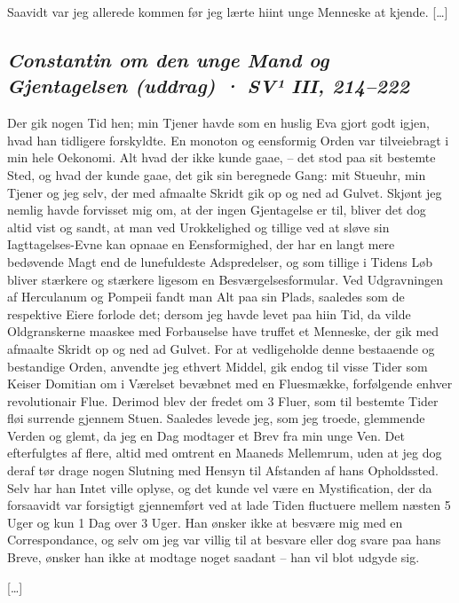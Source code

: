 \documentclass[12pt,a4paper]{article}
\newcommand{\sectionheading}[1]{\subsection*{\normalfont\itshape #1}}
\begin{document}
Saavidt var jeg allerede kommen før jeg lærte hiint unge Menneske at kjende. […]

\sectionheading{Constantin om den unge Mand og Gjentagelsen (uddrag)  ·  SV¹ III, 214–222}

Der gik nogen Tid hen; min Tjener havde som en huslig Eva gjort godt igjen, hvad han tidligere forskyldte. En monoton og eensformig Orden var tilveiebragt i min hele Oekonomi. Alt hvad der ikke kunde gaae, – det stod paa sit bestemte Sted, og hvad der kunde gaae, det gik sin beregnede Gang: mit Stueuhr, min Tjener og jeg selv, der med afmaalte Skridt gik op og ned ad Gulvet. Skjønt jeg nemlig havde forvisset mig om, at der ingen Gjentagelse er til, bliver det dog altid vist og sandt, at man ved Urokkelighed og tillige ved at sløve sin Iagttagelses-Evne kan opnaae en Eensformighed, der har en langt mere bedøvende Magt end de lunefuldeste Adspredelser, og som tillige i Tidens Løb bliver stærkere og stærkere ligesom en Besværgelsesformular. Ved Udgravningen af Herculanum og Pompeii fandt man Alt paa sin Plads, saaledes som de respektive Eiere forlode det; dersom jeg havde levet paa hiin Tid, da vilde Oldgranskerne maaskee med Forbauselse have truffet et Menneske, der gik med afmaalte Skridt op og ned ad Gulvet. For at vedligeholde denne bestaaende og bestandige Orden, anvendte jeg ethvert Middel, gik endog til visse Tider som Keiser Domitian om i Værelset bevæbnet med en Fluesmække, forfølgende enhver revolutionair Flue. Derimod blev der fredet om 3 Fluer, som til bestemte Tider fløi surrende gjennem Stuen. Saaledes levede jeg, som jeg troede, glemmende Verden og glemt, da jeg en Dag modtager et Brev fra min unge Ven. Det efterfulgtes af flere, altid med omtrent en Maaneds Mellemrum, uden at jeg dog deraf tør drage nogen Slutning med Hensyn til Afstanden af hans Opholdssted. Selv har han Intet ville oplyse, og det kunde vel være en Mystification, der da forsaavidt var forsigtigt gjennemført ved at lade Tiden fluctuere mellem næsten 5 Uger og kun 1 Dag over 3 Uger. Han ønsker ikke at besvære mig med en Correspondance, og selv om jeg var villig til at besvare eller dog svare paa hans Breve, ønsker han ikke at modtage noget saadant – han vil blot udgyde sig.

[…]
\end{document}

